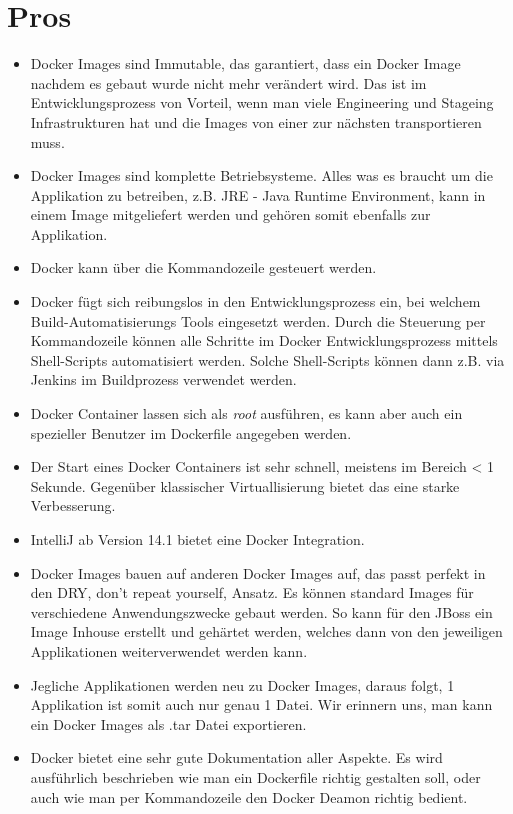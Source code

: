 \section{Pros}

\begin{itemize}

\item Docker Images sind Immutable, das garantiert, dass ein Docker Image nachdem es gebaut wurde
nicht mehr verändert wird. Das ist im Entwicklungsprozess von Vorteil, wenn man viele Engineering und
Stageing Infrastrukturen hat und die Images von einer zur nächsten transportieren muss.

\item Docker Images sind komplette Betriebsysteme. Alles was es braucht um die Applikation
zu betreiben, z.B. JRE - Java Runtime Environment, kann in einem Image mitgeliefert werden
und gehören somit ebenfalls zur Applikation.

\item Docker kann über die Kommandozeile gesteuert werden.

\item Docker fügt sich reibungslos in den Entwicklungsprozess ein, bei welchem Build-Automatisierungs
Tools eingesetzt werden. Durch die Steuerung per Kommandozeile können alle Schritte im Docker
Entwicklungsprozess mittels Shell-Scripts automatisiert werden. Solche Shell-Scripts können dann z.B.
via Jenkins im Buildprozess verwendet werden.

\item Docker Container lassen sich als \textit{root} ausführen, es kann aber auch ein spezieller
Benutzer im Dockerfile angegeben werden.

\item Der Start eines Docker Containers ist sehr schnell, meistens im Bereich < 1 Sekunde.
Gegenüber klassischer Virtuallisierung bietet das eine starke Verbesserung.

\item IntelliJ ab Version 14.1 bietet eine Docker Integration.

\item Docker Images bauen auf anderen Docker Images auf, das passt perfekt in den DRY, don't repeat
yourself, Ansatz. Es können standard Images für verschiedene Anwendungszwecke gebaut werden. So kann
für den JBoss ein Image Inhouse erstellt und gehärtet werden, welches dann von den jeweiligen
Applikationen weiterverwendet werden kann.

\item Jegliche Applikationen werden neu zu Docker Images, daraus folgt, 1 Applikation ist somit auch nur genau
1 Datei. Wir erinnern uns, man kann ein Docker Images als .tar Datei exportieren.

\item Docker bietet eine sehr gute Dokumentation aller Aspekte. Es wird ausführlich beschrieben
wie man ein Dockerfile richtig gestalten soll, oder auch wie man per Kommandozeile den Docker
Deamon richtig bedient.

\end{itemize}

